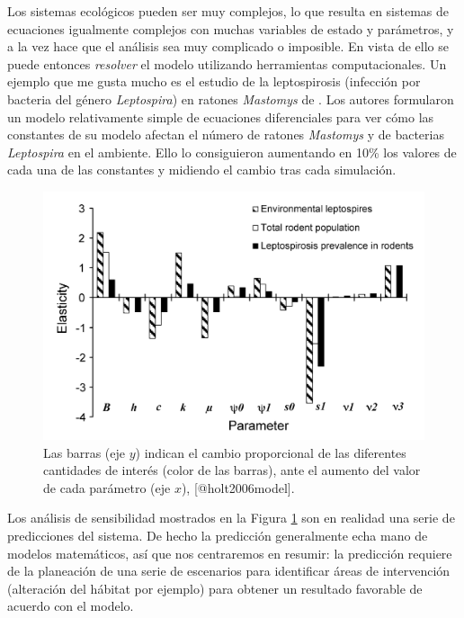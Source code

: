 \documentclass[
]{book}
\begin{document}
Los sistemas ecológicos pueden ser muy complejos, lo que resulta en sistemas de ecuaciones igualmente complejos con muchas variables de estado y parámetros, y a la vez hace que el análisis sea muy complicado o imposible. En vista de ello se puede entonces \emph{resolver} el modelo utilizando herramientas computacionales. Un ejemplo que me gusta mucho es el estudio de la leptospirosis (infección por bacteria del género \emph{Leptospira}) en ratones \emph{Mastomys} de \citet{holt2006model}. Los autores formularon un modelo relativamente simple de ecuaciones diferenciales para ver cómo las constantes de su modelo afectan el número de ratones \emph{Mastomys} y de bacterias \emph{Leptospira} en el ambiente. Ello lo consiguieron aumentando en 10\% los valores de cada una de las constantes y midiendo el cambio tras cada simulación.

\begin{figure}

{\centering \includegraphics[width=22.76in]{Unidad-I/lepto} 

}

\caption{Las barras (eje $y$) indican el cambio proporcional de las diferentes cantidades de interés (color de las barras), ante el aumento del valor de cada parámetro (eje $x$), [@holt2006model].}\label{fig:lepto}
\end{figure}

Los análisis de sensibilidad mostrados en la Figura \ref{fig:lepto} son en realidad una serie de predicciones del sistema. De hecho la predicción generalmente echa mano de modelos matemáticos, así que nos centraremos en resumir: la predicción requiere de la planeación de una serie de escenarios para identificar áreas de intervención (alteración del hábitat por ejemplo) para obtener un resultado favorable de acuerdo con el modelo.
\end{document}
